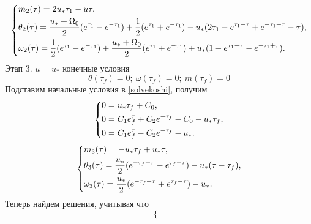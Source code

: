 \documentclass[a4paper,14pt]{article}
\theoremstyle{plain} %
\theoremstyle{definition} %
\theoremstyle{remark} %
\begin{document}
{\begin{equation}\label{final2stage}
    \left\{ {\begin{aligned}
                 & m_2(\tau) = 2u_*\tau_1-u\tau, \hfill                                                                                                                            \\
                 & \theta_2(\tau) = \frac{u_*+\Omega_0}{2}(e^{\tau_1}-e^{-\tau_1})+\frac{1}{2}(e^{\tau_1}+e^{-\tau_1})-u_*(2\tau_1-e^{\tau_1-\tau}+e^{-\tau_1+\tau}-\tau) , \hfill \\
                 & \omega_2(\tau) = \frac{1}{2}(e^{\tau_1}-e^{-\tau_1})+\frac{u_*+\Omega_0}{2}(e^{\tau_1}+e^{-\tau_1})+u_*(1-e^{\tau_1-\tau}-e^{-\tau_1+\tau})  . \hfill           \\
            \end{aligned}} \right.
\end{equation}
Этап 3. $u=u_*$ конечные условия
\[
    \theta(\tau_f)=0;\ \omega(\tau_f)=0;\ m(\tau_f)=0
\]
Подставим начальные условия в \eqref{solvekoshi}, получим
\begin{equation}\label{stage31}
    \left\{ {\begin{aligned}
                 & 0 = u_*\tau_f+C_0, \hfill                             \\
                 & 0 = C_1e^\tau_f+C_2e^{-\tau_f}-C_0-u_*\tau_f , \hfill \\
                 & 0 = C_1e^\tau_f-C_2e^{-\tau_f}-u_*  . \hfill          \\
            \end{aligned}} \right.
\end{equation}
\begin{equation}\label{final3stage}
    \left\{ {\begin{aligned}
                 & m_3(\tau) = -u_*\tau_f+u_*\tau, \hfill                                                    \\
                 & \theta_3(\tau) = \frac{u_*}{2}(e^{-\tau_f+\tau}-e^{\tau_f-\tau})-u_*(\tau-\tau_f), \hfill \\
                 & \omega_3(\tau) = \frac{u_*}{2}(e^{-\tau_f+\tau}+e^{\tau_f-\tau})-u_*  . \hfill            \\
            \end{aligned}} \right.
\end{equation}
Теперь найдем решения, учитывая что
\begin{equation}\label{T2equalT3}
    \left\{ {\begin{aligned}

\end{aligned}}
\end{equation}}
\end{document}
